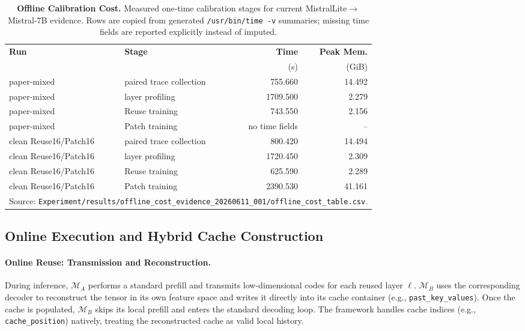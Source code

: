 \documentclass{article}
\theoremstyle{plain}
\theoremstyle{definition}
\theoremstyle{remark}
\begin{document}
\begin{table}[H]
  \centering
  \footnotesize
  \setlength{\abovecaptionskip}{2pt}
  \setlength{\belowcaptionskip}{2pt}
  \caption{\textbf{Offline Calibration Cost.}
  Measured one-time calibration stages for current MistralLite$\to$Mistral-7B
  evidence.  Rows are copied from generated \texttt{/usr/bin/time -v}
  summaries; missing time fields are reported explicitly instead of imputed.}
  \label{tab:offline_cost}
  \renewcommand{\arraystretch}{0.9}
  \begin{tabular}{llrr}
    \toprule
    \textbf{Run} & \textbf{Stage} & \textbf{Time} & \textbf{Peak Mem.} \\
    & & (s) & (GiB) \\
    \midrule
    paper-mixed & paired trace collection & 755.660 & 14.492 \\
    paper-mixed & layer profiling & 1709.500 & 2.279 \\
    paper-mixed & Reuse training & 743.550 & 2.156 \\
    paper-mixed & Patch training & no time fields & -- \\
    clean Reuse16/Patch16 & paired trace collection & 800.420 & 14.494 \\
    clean Reuse16/Patch16 & layer profiling & 1720.450 & 2.309 \\
    clean Reuse16/Patch16 & Reuse training & 625.590 & 2.289 \\
    clean Reuse16/Patch16 & Patch training & 2390.530 & 41.161 \\
    \midrule
    \multicolumn{4}{l}{Source: \texttt{Experiment/results/offline\_cost\_evidence\_20260611\_001/offline\_cost\_table.csv}.} \\
    \bottomrule
  \end{tabular}
\end{table}

\subsection{Online Execution and Hybrid Cache Construction}

\paragraph{Online Reuse: Transmission and Reconstruction.}
During inference, $\mathcal{M}_A$ performs a standard prefill and transmits low-dimensional codes for each reused layer $\ell$. $\mathcal{M}_B$ uses the corresponding decoder to reconstruct the tensor in its own feature space and writes it directly into its cache container (e.g., \texttt{past\_key\_values}).
Once the cache is populated, $\mathcal{M}_B$ skips its local prefill and enters the standard decoding loop. The framework handles cache indices (e.g., \texttt{cache\_position}) natively, treating the reconstructed cache as valid local history.
\end{document}
